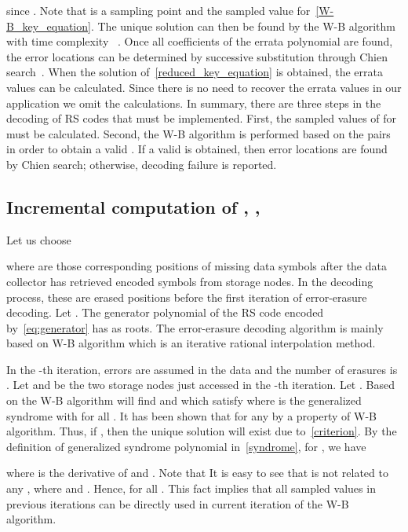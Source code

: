 \documentclass[10pt,journal,letterpaper,compsoc]{IEEEtran}
\newcommand{\0}{{\bf 0}}
\newcounter{step}
\begin{document}
since . Note that  is a sampling point and
 the sampled value for~\eqref{W-B_key_equation}. The unique
solution  can then be found by the W-B
algorithm with time complexity ~\cite{MOO05}.  Once all
coefficients of the errata polynomial are found, the error locations 
can be determined by successive substitution through Chien search~\cite{LIN04}.
When the solution of~\eqref{reduced_key_equation} is obtained, the errata
values can be calculated. Since there is no need to recover the errata values in our application
we omit the calculations. In summary, there are three steps in the
decoding of RS codes that must be implemented. First, the sampled values of
 for  must be calculated. Second, the W-B
algorithm is performed based on the pairs 
in order to obtain a valid . If a valid  is
obtained, then error locations are found by Chien search; otherwise, decoding
failure is reported. 
\subsection{Incremental computation of , , }
Let us choose

where  are those corresponding positions of missing data symbols after
the data collector has retrieved encoded symbols from  storage nodes. In the
decoding process, these are erased positions before the first iteration of
error-erasure decoding. Let .
The generator polynomial of the RS code encoded by~\eqref{eq:generator}
has  as roots.
The error-erasure decoding algorithm is mainly based on W-B algorithm which is
an iterative rational interpolation method.

In the -th iteration,  errors are assumed in the data and the
number of erasures is . Let  and  be the two storage nodes just accessed in the -th iteration. Let . Based on  the W-B algorithm will find  and  which satisfy
 where  is the generalized syndrome with  for all . It has been shown that  for any  by a property of W-B algorithm. Thus, if , then the unique solution will exist due to~\eqref{criterion}. By the definition of generalized syndrome polynomial in~\eqref{syndrome}, for , we have


where  is the derivative of  and . Note that  It is easy to see that  is not related to any , where  and . Hence,  for all . This fact implies that all sampled values in previous iterations can be directly used in current iteration of the W-B algorithm.
\end{document}
